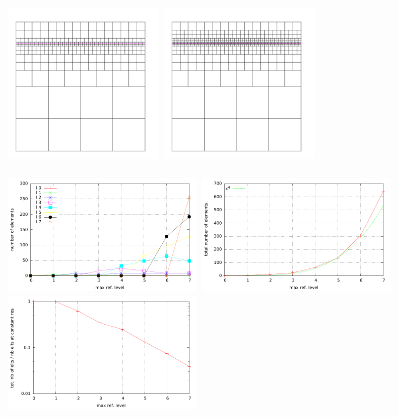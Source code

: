 \includegraphics[width=4cm]{images/meshes/AMR/amr_6}
\includegraphics[width=4cm]{images/meshes/AMR/amr_7}


\includegraphics[width=5cm]{images/meshes/AMR/amr_data3.pdf}
\includegraphics[width=5cm]{images/meshes/AMR/amr_data4.pdf}
\includegraphics[width=5cm]{images/meshes/AMR/amr_data5.pdf}



